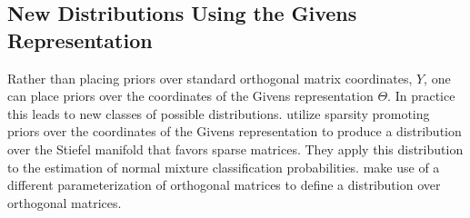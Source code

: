 \documentclass[ba]{imsart}
\numberwithin{equation}{section}
\theoremstyle{plain}
\begin{document}

\subsection{New Distributions Using the Givens Representation}
Rather than placing priors over standard orthogonal matrix coordinates, $Y$, one can place priors over the coordinates of the Givens representation $\Theta$. In practice this leads to new classes of possible distributions. \noindent \cite{cron2016models} utilize sparsity promoting priors over the coordinates of the Givens representation to produce a distribution over the Stiefel manifold that favors sparse matrices. They apply this distribution to the estimation of normal mixture classification probabilities. \cite{leon2006statistical} make use of a different parameterization of orthogonal matrices to define a distribution over orthogonal matrices.

\end{document}

